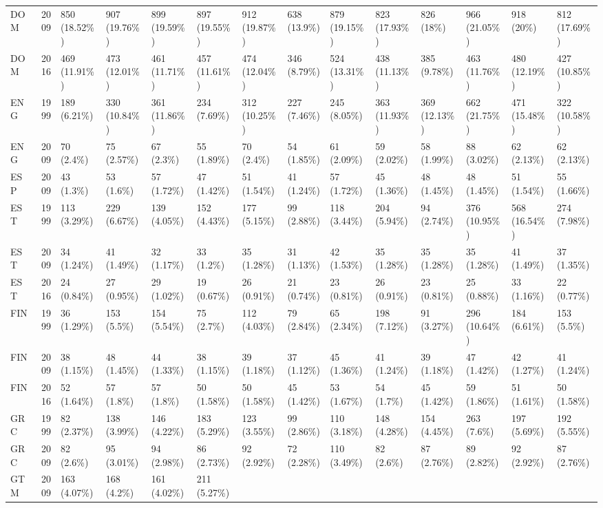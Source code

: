 \documentclass[]{article}
\begin{document}
\begin{longtable}[]{@{}lrllllllllllll@{}}
DOM & 2009 & 850 (18.52\%) & 907 (19.76\%) & 899 (19.59\%) & 897
(19.55\%) & 912 (19.87\%) & 638 (13.9\%) & 879 (19.15\%) & 823 (17.93\%)
& 826 (18\%) & 966 (21.05\%) & 918 (20\%) & 812 (17.69\%)\tabularnewline
DOM & 2016 & 469 (11.91\%) & 473 (12.01\%) & 461 (11.71\%) & 457
(11.61\%) & 474 (12.04\%) & 346 (8.79\%) & 524 (13.31\%) & 438 (11.13\%)
& 385 (9.78\%) & 463 (11.76\%) & 480 (12.19\%) & 427
(10.85\%)\tabularnewline
ENG & 1999 & 189 (6.21\%) & 330 (10.84\%) & 361 (11.86\%) & 234 (7.69\%)
& 312 (10.25\%) & 227 (7.46\%) & 245 (8.05\%) & 363 (11.93\%) & 369
(12.13\%) & 662 (21.75\%) & 471 (15.48\%) & 322 (10.58\%)\tabularnewline
ENG & 2009 & 70 (2.4\%) & 75 (2.57\%) & 67 (2.3\%) & 55 (1.89\%) & 70
(2.4\%) & 54 (1.85\%) & 61 (2.09\%) & 59 (2.02\%) & 58 (1.99\%) & 88
(3.02\%) & 62 (2.13\%) & 62 (2.13\%)\tabularnewline
ESP & 2009 & 43 (1.3\%) & 53 (1.6\%) & 57 (1.72\%) & 47 (1.42\%) & 51
(1.54\%) & 41 (1.24\%) & 57 (1.72\%) & 45 (1.36\%) & 48 (1.45\%) & 48
(1.45\%) & 51 (1.54\%) & 55 (1.66\%)\tabularnewline
EST & 1999 & 113 (3.29\%) & 229 (6.67\%) & 139 (4.05\%) & 152 (4.43\%) &
177 (5.15\%) & 99 (2.88\%) & 118 (3.44\%) & 204 (5.94\%) & 94 (2.74\%) &
376 (10.95\%) & 568 (16.54\%) & 274 (7.98\%)\tabularnewline
EST & 2009 & 34 (1.24\%) & 41 (1.49\%) & 32 (1.17\%) & 33 (1.2\%) & 35
(1.28\%) & 31 (1.13\%) & 42 (1.53\%) & 35 (1.28\%) & 35 (1.28\%) & 35
(1.28\%) & 41 (1.49\%) & 37 (1.35\%)\tabularnewline
EST & 2016 & 24 (0.84\%) & 27 (0.95\%) & 29 (1.02\%) & 19 (0.67\%) & 26
(0.91\%) & 21 (0.74\%) & 23 (0.81\%) & 26 (0.91\%) & 23 (0.81\%) & 25
(0.88\%) & 33 (1.16\%) & 22 (0.77\%)\tabularnewline
FIN & 1999 & 36 (1.29\%) & 153 (5.5\%) & 154 (5.54\%) & 75 (2.7\%) & 112
(4.03\%) & 79 (2.84\%) & 65 (2.34\%) & 198 (7.12\%) & 91 (3.27\%) & 296
(10.64\%) & 184 (6.61\%) & 153 (5.5\%)\tabularnewline
FIN & 2009 & 38 (1.15\%) & 48 (1.45\%) & 44 (1.33\%) & 38 (1.15\%) & 39
(1.18\%) & 37 (1.12\%) & 45 (1.36\%) & 41 (1.24\%) & 39 (1.18\%) & 47
(1.42\%) & 42 (1.27\%) & 41 (1.24\%)\tabularnewline
FIN & 2016 & 52 (1.64\%) & 57 (1.8\%) & 57 (1.8\%) & 50 (1.58\%) & 50
(1.58\%) & 45 (1.42\%) & 53 (1.67\%) & 54 (1.7\%) & 45 (1.42\%) & 59
(1.86\%) & 51 (1.61\%) & 50 (1.58\%)\tabularnewline
GRC & 1999 & 82 (2.37\%) & 138 (3.99\%) & 146 (4.22\%) & 183 (5.29\%) &
123 (3.55\%) & 99 (2.86\%) & 110 (3.18\%) & 148 (4.28\%) & 154 (4.45\%)
& 263 (7.6\%) & 197 (5.69\%) & 192 (5.55\%)\tabularnewline
GRC & 2009 & 82 (2.6\%) & 95 (3.01\%) & 94 (2.98\%) & 86 (2.73\%) & 92
(2.92\%) & 72 (2.28\%) & 110 (3.49\%) & 82 (2.6\%) & 87 (2.76\%) & 89
(2.82\%) & 92 (2.92\%) & 87 (2.76\%)\tabularnewline
GTM & 2009 & 163 (4.07\%) & 168 (4.2\%) & 161 (4.02\%) & 211 (5.27\%) &

\end{longtable}
\end{document}
